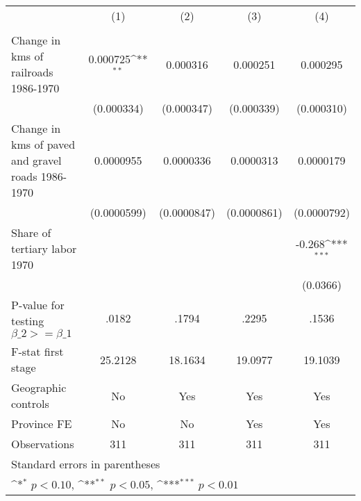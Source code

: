 {
\def\sym#1{\ifmmode^{#1}\else\(^{#1}\)\fi}
\begin{tabular}{l*{4}{c}}
\hline\hline
                &\multicolumn{1}{c}{(1)}&\multicolumn{1}{c}{(2)}&\multicolumn{1}{c}{(3)}&\multicolumn{1}{c}{(4)}\\
                &\multicolumn{1}{c}{}&\multicolumn{1}{c}{}&\multicolumn{1}{c}{}&\multicolumn{1}{c}{}\\
\hline
Change in kms of railroads 1986-1970& 0.000725\sym{**} & 0.000316         & 0.000251         & 0.000295         \\
                &(0.000334)         &(0.000347)         &(0.000339)         &(0.000310)         \\
[1em]
Change in kms of paved and gravel roads 1986-1970&0.0000955         &0.0000336         &0.0000313         &0.0000179         \\
                &(0.0000599)         &(0.0000847)         &(0.0000861)         &(0.0000792)         \\
[1em]
Share of tertiary labor 1970&                  &                  &                  &   -0.268\sym{***}\\
                &                  &                  &                  & (0.0366)         \\
\hline
P-value for testing $\beta\_{2} >= \beta\_{1}$&    .0182         &    .1794         &    .2295         &    .1536         \\
F-stat first stage&  25.2128         &  18.1634         &  19.0977         &  19.1039         \\
Geographic controls&       No         &      Yes         &      Yes         &      Yes         \\
Province FE     &       No         &       No         &      Yes         &      Yes         \\
Observations    &      311         &      311         &      311         &      311         \\
\hline\hline
\multicolumn{5}{l}{\footnotesize Standard errors in parentheses}\\
\multicolumn{5}{l}{\footnotesize \sym{*} \(p<0.10\), \sym{**} \(p<0.05\), \sym{***} \(p<0.01\)}\\
\end{tabular}
}
